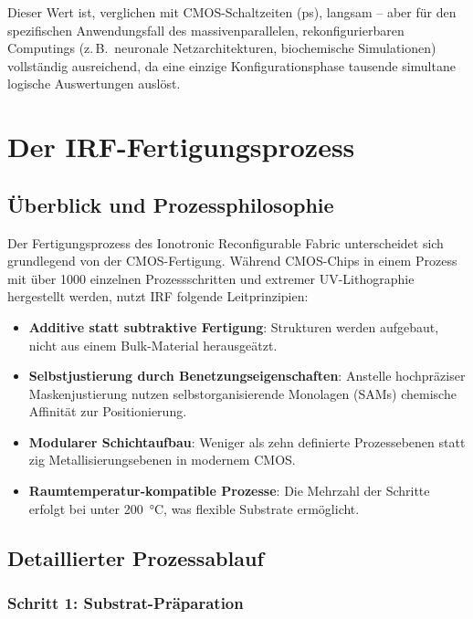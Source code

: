 ﻿\documentclass[a4paper,12pt]{scrreprt}
\theoremstyle{definition}
\begin{document}
Dieser Wert ist, verglichen mit CMOS-Schaltzeiten (ps), langsam -- aber für
den spezifischen Anwendungsfall des massivenparallelen, rekonfigurierbaren
Computings (z.\,B.\ neuronale Netzarchitekturen, biochemische Simulationen)
vollständig ausreichend, da eine einzige Konfigurationsphase tausende
simultane logische Auswertungen auslöst.

\section{Der IRF-Fertigungsprozess}

\subsection{Überblick und Prozessphilosophie}

Der Fertigungsprozess des Ionotronic Reconfigurable Fabric unterscheidet
sich grundlegend von der CMOS-Fertigung. Während CMOS-Chips in einem
Prozess mit über 1000 einzelnen Prozessschritten und extremer UV-Lithographie
hergestellt werden, nutzt IRF folgende Leitprinzipien:

\begin{itemize}
	\item \textbf{Additive statt subtraktive Fertigung}: Strukturen werden
	aufgebaut, nicht aus einem Bulk-Material herausgeätzt.
	\item \textbf{Selbstjustierung durch Benetzungseigenschaften}: Anstelle
	hochpräziser Maskenjustierung nutzen selbstorganisierende Monolagen
	(SAMs) chemische Affinität zur Positionierung.
	\item \textbf{Modularer Schichtaufbau}: Weniger als zehn definierte
	Prozessebenen statt zig Metallisierungsebenen in modernem CMOS.
	\item \textbf{Raumtemperatur-kompatible Prozesse}: Die Mehrzahl der
	Schritte erfolgt bei unter 200\, °C, was flexible Substrate ermöglicht.
\end{itemize}

\subsection{Detaillierter Prozessablauf}

\subsubsection{Schritt 1: Substrat-Präparation}
\end{document}
